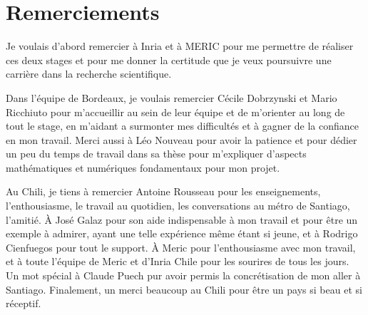 \section*{Remerciements}

\indent Je voulais d'abord remercier à Inria et à MERIC pour me permettre de réaliser ces deux stages et pour me donner la certitude que je veux poursuivre une carrière dans la recherche scientifique.

\indent Dans l'équipe de Bordeaux, je voulais remercier Cécile Dobrzynski et Mario Ricchiuto pour m'accueillir au sein de leur équipe et de m'orienter au long de tout le stage, en m'aidant a surmonter mes difficultés et à gagner de la confiance en mon travail.  Merci aussi à Léo Nouveau pour avoir la patience et pour dédier un peu du temps de travail dans sa thèse pour m'expliquer d'aspects mathématiques et numériques fondamentaux pour mon projet.

\indent Au Chili, je tiens à remercier Antoine Rousseau pour les enseignements, l’enthousiasme, le travail au quotidien, les conversations au métro de Santiago, l'amitié. À José Galaz pour son aide indispensable à mon travail et pour être un exemple à admirer, ayant une telle expérience même étant si jeune, et à Rodrigo Cienfuegos pour tout le support. À Meric pour l'enthousiasme avec mon travail, et à toute l'équipe de Meric et d'Inria Chile pour les sourires de tous les jours. Un mot spécial à Claude Puech pur avoir permis la concrétisation de mon aller à Santiago. Finalement, un merci beaucoup au Chili pour être un pays si beau et si réceptif.
